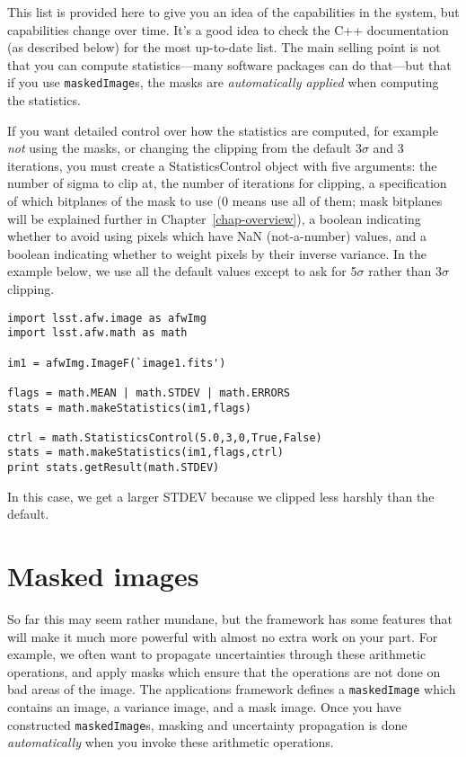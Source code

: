 \documentclass{book}
\begin{document}
This list is provided here to give you an idea of the capabilities in
the system, but capabilities change over time.  It's a good idea to
check the C++ documentation (as described below) for the most
up-to-date list.  The main selling point is not that you can compute
statistics---many software packages can do that---but that if you use
\texttt{maskedImage}s, the masks are {\it automatically applied} when
computing the statistics.

If you want detailed control over how the statistics are computed, for
example {\it not} using the masks, or changing the clipping from the
default 3$\sigma$ and 3 iterations, you must create a
StatisticsControl object with five arguments: the number of sigma to
clip at, the number of iterations for clipping, a specification of
which bitplanes of the mask to use (0 means use all of them; mask
bitplanes will be explained further in Chapter~\ref{chap-overview}), a
boolean indicating whether to avoid using pixels which have NaN
(not-a-number) values, and a boolean indicating whether to weight
pixels by their inverse variance.  In the example below, we use all
the default values except to ask for 5$\sigma$ rather than 3$\sigma$
clipping.

\begin{verbatim}
import lsst.afw.image as afwImg
import lsst.afw.math as math

im1 = afwImg.ImageF(`image1.fits')

flags = math.MEAN | math.STDEV | math.ERRORS 
stats = math.makeStatistics(im1,flags)

ctrl = math.StatisticsControl(5.0,3,0,True,False)
stats = math.makeStatistics(im1,flags,ctrl)
print stats.getResult(math.STDEV) 
\end{verbatim}

In this case, we get a larger STDEV because we clipped less harshly
than the default.


\section{Masked images}

So far this may seem rather mundane, but the framework has some
features that will make it much more powerful with almost no extra
work on your part.  For example, we often want to propagate
uncertainties through these arithmetic operations, and apply masks
which ensure that the operations are not done on bad areas of the
image.  The applications framework defines a \texttt{maskedImage}
which contains an image, a variance image, and a mask image.
Once you have constructed \texttt{maskedImage}s, masking and
uncertainty propagation is done {\it automatically} when you invoke
these arithmetic operations.
\end{document}
